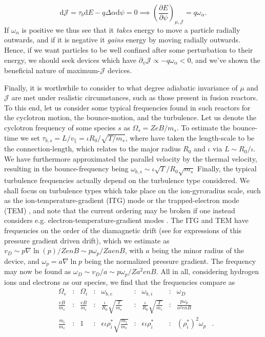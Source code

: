 \begin{equation}
    \mathrm{d} \mathcal{J} = \tau_b \mathrm{d}E - q \Delta \alpha \mathrm{d}\psi =0 \implies \left(\frac{\partial E}{\partial \psi}\right)_{\mu,\mathcal{J}} = q \omega_\alpha.
\end{equation}
If $\omega_\alpha$ is positive we thus see that it \textit{takes} energy to move a particle radially outwards, and if it is negative it \textit{gains} energy by moving radially outwards. Hence, if we want particles to be well confined after some perturbation to their energy, we should seek devices which have $ \partial_\psi \mathcal{J} \propto - q\omega_\alpha < 0$, and we've shown the beneficial nature of maximum-$\mathcal{J}$ devices. \par 
Finally, it is worthwhile to consider to what degree adiabatic invariance of $\mu$ and $\mathcal{J}$ are met under realistic circumstances, such as those present in fusion reactors. To this end, let us consider some typical frequencies found in such reactors for the cyclotron motion, the bounce-motion, and the turbulence. Let us denote the cyclotron frequency of some species $s$ as $\Omega_s = Ze B / m_s$. To estimate the bounce-time we set $\tau_{b,s} = L/v_\parallel=\iota R_0/\sqrt{T/m_s}$, where have taken the length-scale to be the connection-length, which relates to the major radius $R_0$ and $\iota$ via $L\sim R_0/\iota$. We have furthermore approximated the parallel velocity by the thermal velocity, resulting in the bounce-frequency being $\omega_{b,s}\sim \iota \sqrt{T}/R_0\sqrt{m_s}$ Finally, the typical turbulence frequencies actually depend on the turbulence type considered. We shall focus on turbulence types which take place on the ion-gyroradius scale, such as the ion-temperature-gradient (ITG) mode or the trapped-electron mode (TEM) \cite{helander2013collisionless,plunk2014collisionless}, and note that the current ordering may be broken if one instead considers e.g. electron-temperature-gradient modes \cite{lee1987collisionless}. The ITG and TEM have frequencies on the order of the diamagnetic drift (see \citet{de2012guiding} for expressions of this pressure gradient driven drift), which we estimate as $v_D \sim p \nabla \ln(p)/ZenB \sim p \omega_p/ZaenB$, with $a$ being the minor radius of the device, and $\omega_p = a\nabla \ln p$ being the normalized pressure gradient. The frequency may now be found as $\omega_D \sim v_D/a \sim p \omega_p /Za^2 e n B$. All in all, considering hydrogen ions and electrons as our species, we find that the frequencies compare as
\begin{equation*}
    \begin{aligned}
        &\Omega_e & \colon & \Omega_i & \colon & \omega_{b,e} & \colon & \omega_{b,i} & \colon & \omega_{D} & \\
        & \frac{eB}{m_e} & \colon & \frac{eB}{m_i} & \colon & \frac{\iota}{R_0}\sqrt{\frac{T}{m_e}} & \colon & \frac{\iota}{R_0} \sqrt{\frac{T}{m_i}} & \colon & \frac{p \omega_p}{a^2 enB}  & \\
        & \frac{m_i}{m_e} & \colon & 1 & \colon & \epsilon \iota \rho_i^* \sqrt{\frac{m_i}{m_e}} & \colon & \epsilon \iota \rho_i^* & \colon &  (\rho_i^*)^2 \omega_p &.
    \end{aligned}
\end{equation*}
